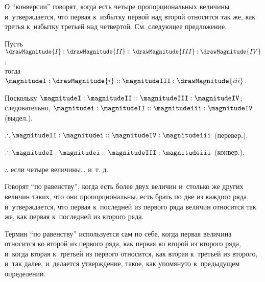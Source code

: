 \documentclass[letters]{byrne-book}
\begin{document}
\label{def:V.XVII} %
О \enquote{конверсии} говорят, когда есть четыре пропорциональных величины и~утверждается, что первая к~избытку первой над второй относится так же, как третья к~избытку третьей над четвертой. См. следующее предложение.

\vfill\pagebreak

\label{prop:V.E}

\begin{center}
Пусть $\drawMagnitude{I} : \drawMagnitude{II} :: \drawMagnitude{III} : \drawMagnitude{IV}$,\\
тогда $\magnitudeI : \drawMagnitude{i} :: \magnitudeIII : \drawMagnitude{iii}$.

Поскольку $\magnitudeI : \magnitudeII :: \magnitudeIII : \magnitudeIV$;\\
следовательно, $\magnitudei : \magnitudeII :: \magnitudeiii : \magnitudeIV$ (выдел.).

$\therefore \magnitudeII : \magnitudei :: \magnitudeIV : \magnitudeiii$ (перевер.).

$\therefore \magnitudeI : \magnitudei :: \magnitudeIII : \magnitudeiii$ (конвер.).

$\therefore$ если четыре величины… и~т. д.
\end{center}

\label{def:V.XVIII}
Говорят \enquote{по равенству}, когда есть более двух величин и~столько же других величин таких, что они пропорциональны, есть брать по две из каждого ряда, и~утверждается, что первая к~последней из первого ряда величин относится так же, как первая к~последней из второго ряда.

\vfill\pagebreak

\label{def:V.XIX}
\def\varA{\textcolor{byred}{A}}
\def\varB{\textcolor{byred}{B}}
\def\varC{\textcolor{byyellow}{C}}
\def\varD{\textcolor{byyellow}{D}}
\def\varE{\textcolor{byblue}{E}}
\def\varF{\textcolor{byblue}{F}}
\def\varL{\textcolor{byred}{L}}
\def\varM{\textcolor{byred}{M}}
\def\varN{\textcolor{byyellow}{N}}
\def\varO{\textcolor{byyellow}{O}}
\def\varP{\textcolor{byblue}{P}}
\def\varQ{\textcolor{byblue}{Q}}
Термин \enquote{по равенству} используется сам по себе, когда первая величина относится ко второй из первого ряда, как первая ко второй из второго ряда, и~когда вторая к~третьей из первого относится, как вторая к~третьей из второго, и~так далее, и~делается утверждение, такое, как упомянуто в~предыдущем определении.
\end{document}
